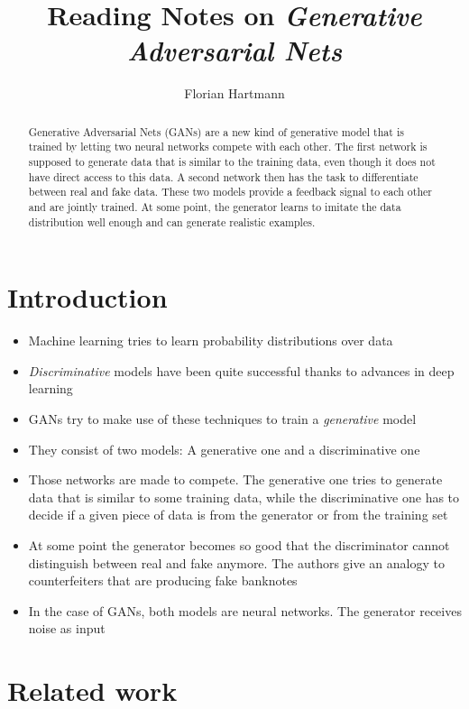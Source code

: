 \documentclass{article}
\title{Reading Notes on \emph{Generative Adversarial Nets}}
\date{}
\author{Florian Hartmann}
\begin{document}
\maketitle

\begin{abstract}
    Generative Adversarial Nets (GANs) are a new kind of generative model that is trained by letting two neural networks compete with each other.
    The first network is supposed to generate data that is similar to the training data, even though it does not have direct access to this data.
    A second network then has the task to differentiate between real and fake data.
    These two models provide a feedback signal to each other and are jointly trained.
    At some point, the generator learns to imitate the data distribution well enough and can generate realistic examples.
\end{abstract}

\section{Introduction}

\begin{itemize}
    \item Machine learning tries to learn probability distributions over data
    \item \emph{Discriminative} models have been quite successful thanks to advances in deep learning
    \item GANs try to make use of these techniques to train a \emph{generative} model
    \item They consist of two models: A generative one and a discriminative one
    \item Those networks are made to compete. The generative one tries to generate data that is similar to some training data, while the discriminative one has to decide if a given piece of data is from the generator or from the training set
    \item At some point the generator becomes so good that the discriminator cannot distinguish between real and fake anymore. The authors give an analogy to counterfeiters that are producing fake banknotes
    \item In the case of GANs, both models are neural networks. The generator receives noise as input
\end{itemize}

\section{Related work}
\end{document}
